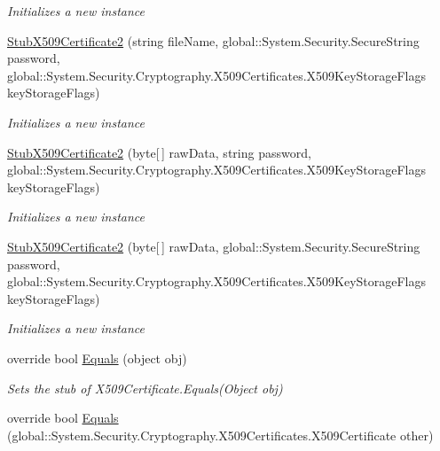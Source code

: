 \begin{DoxyCompactItemize}
\begin{DoxyCompactList}\small\item\em Initializes a new instance\end{DoxyCompactList}\item 
\hyperlink{class_system_1_1_security_1_1_cryptography_1_1_x509_certificates_1_1_fakes_1_1_stub_x509_certificate2_aaf185b10fd3db1b18c08f4b309e1f05a}{Stub\-X509\-Certificate2} (string file\-Name, global\-::\-System.\-Security.\-Secure\-String password, global\-::\-System.\-Security.\-Cryptography.\-X509\-Certificates.\-X509\-Key\-Storage\-Flags key\-Storage\-Flags)
\begin{DoxyCompactList}\small\item\em Initializes a new instance\end{DoxyCompactList}\item 
\hyperlink{class_system_1_1_security_1_1_cryptography_1_1_x509_certificates_1_1_fakes_1_1_stub_x509_certificate2_add5c52d79723dd9929243aaaa8f27b6d}{Stub\-X509\-Certificate2} (byte\mbox{[}$\,$\mbox{]} raw\-Data, string password, global\-::\-System.\-Security.\-Cryptography.\-X509\-Certificates.\-X509\-Key\-Storage\-Flags key\-Storage\-Flags)
\begin{DoxyCompactList}\small\item\em Initializes a new instance\end{DoxyCompactList}\item 
\hyperlink{class_system_1_1_security_1_1_cryptography_1_1_x509_certificates_1_1_fakes_1_1_stub_x509_certificate2_ad26433ec95f8be8eec98179f515e4185}{Stub\-X509\-Certificate2} (byte\mbox{[}$\,$\mbox{]} raw\-Data, global\-::\-System.\-Security.\-Secure\-String password, global\-::\-System.\-Security.\-Cryptography.\-X509\-Certificates.\-X509\-Key\-Storage\-Flags key\-Storage\-Flags)
\begin{DoxyCompactList}\small\item\em Initializes a new instance\end{DoxyCompactList}\item 
override bool \hyperlink{class_system_1_1_security_1_1_cryptography_1_1_x509_certificates_1_1_fakes_1_1_stub_x509_certificate2_a1bdf60ab700a96dc688ad3b085764edf}{Equals} (object obj)
\begin{DoxyCompactList}\small\item\em Sets the stub of X509\-Certificate.\-Equals(\-Object obj)\end{DoxyCompactList}\item 
override bool \hyperlink{class_system_1_1_security_1_1_cryptography_1_1_x509_certificates_1_1_fakes_1_1_stub_x509_certificate2_a9d77cad7b0e9b9b3291c8a39d211d6f6}{Equals} (global\-::\-System.\-Security.\-Cryptography.\-X509\-Certificates.\-X509\-Certificate other)

\end{DoxyCompactItemize}

